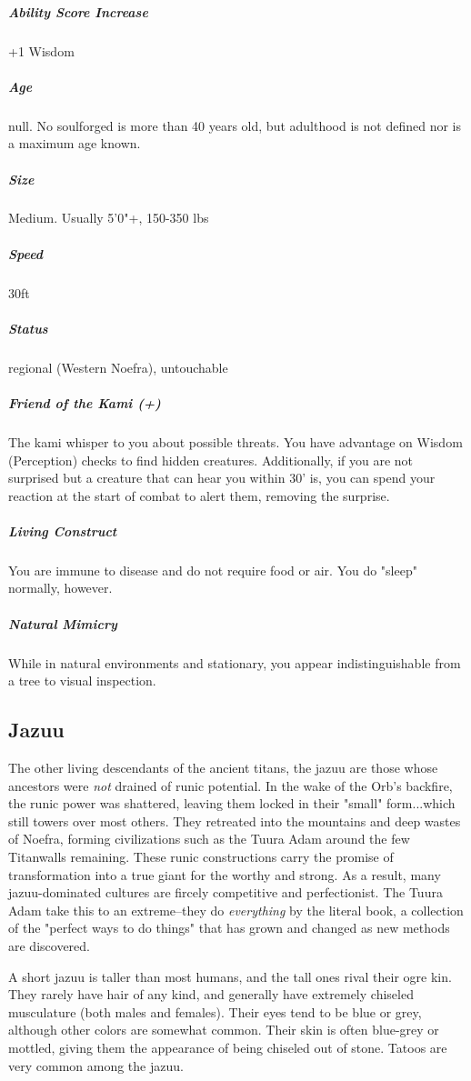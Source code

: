 \subparagraph*{Ability Score Increase}  +1 Wisdom

\subparagraph*{Age}  null. No soulforged is more than 40 years old, but adulthood is not defined nor is a maximum age known.

\subparagraph*{Size}  Medium. Usually 5'0"+, 150-350 lbs

\subparagraph*{Speed}  30ft

\subparagraph*{Status}  regional (Western Noefra), untouchable

\subparagraph*{Friend of the Kami (+)}  The kami whisper to you about possible threats. You have advantage on Wisdom (Perception) checks to find hidden creatures. Additionally, if you are not surprised but a creature that can hear you within 30' is, you can spend your reaction at the start of combat to alert them, removing the surprise.

\subparagraph*{Living Construct}  You are immune to disease and do not require food or air. You do "sleep" normally, however.

\subparagraph*{Natural Mimicry}  While in natural environments and stationary, you appear indistinguishable from a tree to visual inspection.

\subsection{Jazuu} \label{lineage:jazuu}

The other living descendants of the ancient titans, the jazuu are those whose ancestors were \textit{not} drained of runic potential. In the wake of the Orb's backfire, the runic power was shattered, leaving them locked in their "small" form...which still towers over most others. They retreated into the mountains and deep wastes of Noefra, forming civilizations such as the Tuura Adam around the few Titanwalls remaining. These runic constructions carry the promise of transformation into a true giant for the worthy and strong. As a result, many jazuu-dominated cultures are fircely competitive and perfectionist. The Tuura Adam take this to an extreme--they do \textit{everything} by the literal book, a collection of the "perfect ways to do things" that has grown and changed as new methods are discovered.

A short jazuu is taller than most humans, and the tall ones rival their ogre kin. They rarely have hair of any kind, and generally have extremely chiseled musculature (both males and females). Their eyes tend to be blue or grey, although other colors are somewhat common. Their skin is often blue-grey or mottled, giving them the appearance of being chiseled out of stone. Tatoos are very common among the jazuu.


